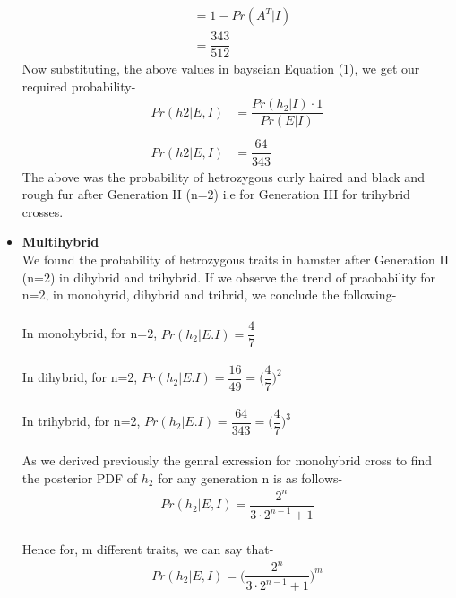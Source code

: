 \documentclass{article}
\begin{document}
\begin{itemize}
\begin{align*}
&= 1 - Pr(A^{T}|I)\\
&= \dfrac{343}{512}
\end{align*}
Now substituting, the above values in bayseian Equation (1), we get our required probability-
\begin{align*}
Pr(h2|E,I) &= \dfrac{Pr(h_2|I)\cdot 1}{Pr(E|I)} \\\\
Pr(h2|E,I) &= \dfrac{64}{343} 
\end{align*}
The above was the probability of hetrozygous curly haired and black and rough fur after Generation II (n=2) i.e for Generation III for trihybrid crosses.

\item \textbf{Multihybrid}\\
We found the probability of hetrozygous traits in hamster after Generation II (n=2) in dihybrid and trihybrid. If we observe the trend of praobability for n=2, in monohyrid, dihybrid and tribrid, we conclude the following-\\\\
In monohybrid, for n=2, $ Pr(h_2|E.I) = \dfrac{4}{7} $\\\\
In dihybrid, for n=2, $ Pr(h_2|E.I) = \dfrac{16}{49} = \Big(\dfrac{4}{7}\Big)^{2}  $\\\\
In trihybrid, for n=2, $ Pr(h_2|E.I) = \dfrac{64}{343} = \Big(\dfrac{4}{7}\Big)^{3} $\\\\
As we derived previously the genral exression for monohybrid cross to find the posterior PDF of $ h_2 $ for any generation n is as follows-
\begin{align*}
Pr(h_2|E,I) = \dfrac{2^n}{3\cdot 2^{n-1} + 1}
\end{align*}\\
Hence for, m different traits, we can say that-
\begin{align*}
Pr(h_2|E,I) = \Big(\dfrac{2^n}{3\cdot 2^{n-1} + 1}\Big)^{m}
\end{align*}\\


\end{itemize}
\end{document}
